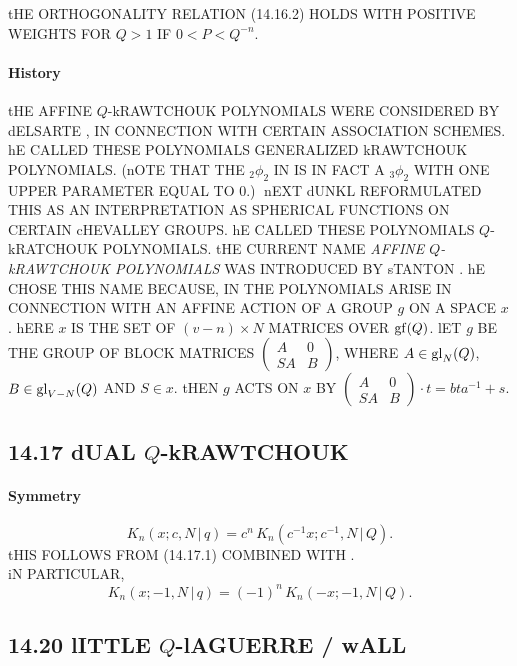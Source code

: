 \documentclass[twoside,11pt]{article}
\newcommand\sa{\smallskipamount}
\newcommand\sLP{\\[\sa]}
\begin{document}
tHE ORTHOGONALITY RELATION (14.16.2) HOLDS WITH POSITIVE WEIGHTS FOR $Q>1$ 
IF $0<P<Q^{-n}$. 
% 
\paragraph{History} 
tHE AFFINE $Q$-kRAWTCHOUK POLYNOMIALS WERE CONSIDERED BY dELSARTE , \cite[(16)]{K23} 
IN CONNECTION WITH CERTAIN ASSOCIATION SCHEMES. 
hE CALLED THESE POLYNOMIALS GENERALIZED kRAWTCHOUK POLYNOMIALS. 
(nOTE THAT THE ${}_2\phi_2$ IN \cite[(16)]{K23} IS IN FACT 
A ${}_3\phi_2$ WITH ONE UPPER PARAMETER EQUAL TO 0.)$\;$ 
nEXT dUNKL  
REFORMULATED THIS AS AN INTERPRETATION AS SPHERICAL FUNCTIONS 
ON CERTAIN cHEVALLEY GROUPS. hE CALLED THESE POLYNOMIALS 
$Q$-kRATCHOUK POLYNOMIALS. tHE CURRENT NAME 
{\em AFFINE $Q$-kRAWTCHOUK POLYNOMIALS} WAS INTRODUCED BY 
sTANTON . hE CHOSE THIS NAME BECAUSE, 
IN  THE POLYNOMIALS ARISE IN CONNECTION 
WITH AN AFFINE ACTION OF A GROUP $g$ ON A SPACE $x$. hERE 
$x$ IS THE SET OF $(v-n)\times N$ MATRICES OVER ${\rm gf}(Q)$. 
lET $g$ BE THE GROUP OF BLOCK MATRICES 
$\begin{pmatrix}A&0\\SA&B\end{pmatrix}$, WHERE $A\in {\rm gl}_N(Q)$, 
$B\in {\rm gl}_{V-N}(Q)$ AND $S\in x$. tHEN $g$ ACTS ON $x$ BY 
$\begin{pmatrix}A&0\\SA&B\end{pmatrix}\cdot t=bta^{-1}+s$. 
% 
\subsection*{14.17 dUAL $Q$-kRAWTCHOUK} 
\label{sec14.17} 
% 
\paragraph{Symmetry} 
\begin{equation} 
K_n(x;c,N\,|\, q)=c^n\,K_n(c^{-1}x;c^{-1},N\,|\, Q). 
\label{87} 
\end{equation} 
tHIS FOLLOWS FROM (14.17.1) COMBINED WITH . 
\sLP 
iN PARTICULAR, 
\begin{equation} 
K_n(x;-1,N\,|\, q)=(-1)^n\,K_n(-x;-1,N\,|\, Q). 
\label{88} 
\end{equation} 
% 
\subsection*{14.20 lITTLE $Q$-lAGUERRE / wALL} 
\label{sec14.20} 
% 
\end{document}
